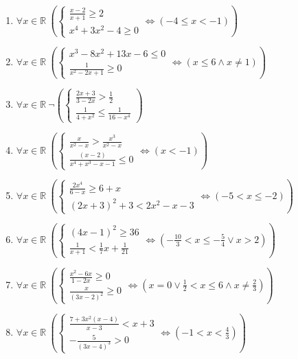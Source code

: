 \documentclass[11pt,a4paper]{article}
\begin{document}
\begin{enumerate}
\item $\displaystyle \forall x \in \mathbb{R}\ \left( \begin{cases} \frac{x - 2}{x + 1} \ge 2 \\ x^{4} + 3x^{2} - 4 \ge 0 \end{cases} \iff \left( -4 \le x < -1 \right) \right)$
\item $\displaystyle \forall x \in \mathbb{R}\ \left( \begin{cases} x^{3} - 8x^{2} + 13x - 6 \le 0 \\ \frac{1}{x^{2} - 2x + 1} \ge 0 \end{cases} \iff \left( x \le 6 \land x \neq 1 \right) \right)$
\item $\displaystyle \forall x \in \mathbb{R}\ \lnot \left( \begin{cases} \frac{2x + 3}{3 - 2x} > \frac{1}{2} \\ \frac{1}{4 + x^{2}} \le \frac{1}{16 - x^{4}} \end{cases} \right)$
\item $\displaystyle \forall x \in \mathbb{R}\ \left( \begin{cases} \frac{x}{x^{2} - x} > \frac{x^{3}}{x^{2} - x} \\ \frac{(x - 2)}{x^{4} + x^{3} - x - 1} \le 0 \end{cases} \iff \left( x < -1 \right) \right)$
\item $\displaystyle \forall x \in \mathbb{R}\ \left( \begin{cases} \frac{2x^{4}}{6 - x} \ge 6 + x \\ (2x + 3)^{2} + 3 < 2x^{2} - x - 3 \end{cases} \iff \left( -5 < x \le -2 \right) \right)$
\item $\displaystyle \forall x \in \mathbb{R}\ \left( \begin{cases} (4x - 1)^{2} \ge 36 \\ \frac{1}{x + 1} < \frac{1}{7}x + \frac{1}{21} \end{cases} \iff \left( -\frac{10}{3} < x \le -\frac{5}{4} \lor x > 2 \right) \right)$
\item $\displaystyle \forall x \in \mathbb{R}\ \left( \begin{cases} \frac{x^{2} - 6x}{1 - 2x} \ge 0 \\ \frac{x}{(3x - 2)^{2}} \ge 0 \end{cases} \iff \left( x = 0 \lor \frac{1}{2} < x \le 6 \land x \neq \frac{2}{3} \right) \right)$
\item $\displaystyle \forall x \in \mathbb{R}\ \left( \begin{cases} \frac{7 + 3x^{2}(x - 4)}{x - 3} < x + 3 \\ -\frac{5}{(3x - 4)^{3}} > 0 \end{cases} \iff \left( -1 < x < \frac{4}{3} \right) \right)$

\end{enumerate}
\end{document}
